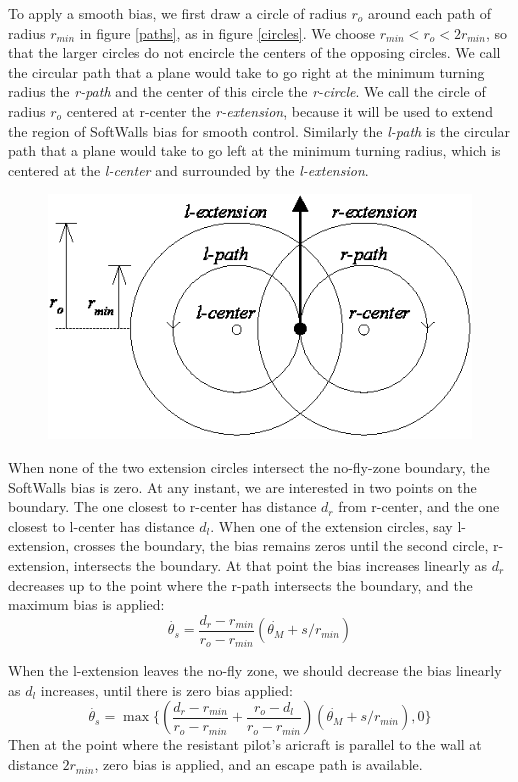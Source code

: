 \documentclass[11pt]{article}
\begin{document}
To apply a smooth bias, we first draw a circle of radius $r_{o}$
around each path of radius $r_{min}$ in figure \ref{paths}, as in
figure \ref{circles}.  We choose $r_{min} < r_{o} < 2r_{min}$, so that
the larger circles do not encircle the centers of the opposing
circles.  We call the circular path that a plane would take to go
right at the minimum turning radius the \textit{r-path} and the center
of this circle the \textit{r-circle}.  We call the circle of radius
$r_{o}$ centered at r-center the \textit{r-extension}, because it will
be used to extend the region of SoftWalls bias for smooth control.
Similarly the \textit{l-path} is the circular path that a plane would
take to go left at the minimum turning radius, which is centered at
the \textit{l-center} and surrounded by the \textit{l-extension}.


\begin{figure}[btp]
\centering
\includegraphics[width=5in]{circles.eps}
\end{figure}


When none of the two extension circles intersect the no-fly-zone
boundary, the SoftWalls bias is zero.  At any instant, we are
interested in two points on the boundary.  The one closest to r-center
has distance $d_{r}$ from r-center, and the one closest to l-center
has distance $d_{l}$.  When one of the extension circles, say
l-extension, crosses the boundary, the bias remains zeros until the
second circle, r-extension, intersects the boundary.  At that point
the bias increases linearly as $d_{r}$ decreases up to the point
where the r-path intersects the boundary, and the maximum bias is
applied:
\[
\dot{\theta_{s}} = \frac{d_{r} - r_{min}}{r_{o} - r_{min}}
(\dot{\theta_{M}} + s/r_{min})
\]

When the l-extension leaves the no-fly zone, we should decrease the
bias linearly as $d_{l}$ increases, until there is zero bias applied:
\[
\dot{\theta_{s}} = \max{ \{(\frac{d_{r} - r_{min}}{r_{o} - r_{min}} +
\frac{r_{o} - d_{l}}{r_{o} - r_{min}}) (\dot{\theta_{M}} + s/r_{min}),
0 \}}
\]
Then at the point where the resistant pilot's aricraft is parallel to
the wall at distance $2r_{min}$, zero bias is applied, and an escape
path is available.
\end{document}
